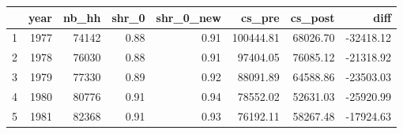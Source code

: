 \begin{tabular}{rrrrrrrr}
  \hline
 & year & nb\_hh & shr\_0 & shr\_0\_new & cs\_pre & cs\_post & diff \\ 
  \hline
1 & 1977 & 74142 & 0.88 & 0.91 & 100444.81 & 68026.70 & -32418.12 \\ 
  2 & 1978 & 76030 & 0.88 & 0.91 & 97404.05 & 76085.12 & -21318.92 \\ 
  3 & 1979 & 77330 & 0.89 & 0.92 & 88091.89 & 64588.86 & -23503.03 \\ 
  4 & 1980 & 80776 & 0.91 & 0.94 & 78552.02 & 52631.03 & -25920.99 \\ 
  5 & 1981 & 82368 & 0.91 & 0.93 & 76192.11 & 58267.48 & -17924.63 \\ 
   \hline
\end{tabular}
